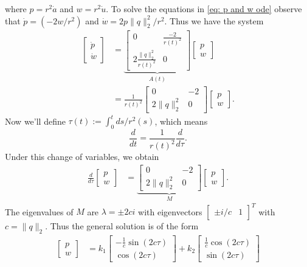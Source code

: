 \documentclass{article}
\begin{document}
where $p = r^2\dot a$ and $w = r^2\dot u$. To solve the equations in \cref{eq: p and w ode} observe that $\dot p = (-2w/r^2)$ and $\dot w = 2p\|q\|_2^2/r^2$. Thus we have the system
\begin{align*}
    \begin{bmatrix}
        \dot p \\ \dot w
    \end{bmatrix} &= 
    \underbrace{
    \begin{bmatrix}
        0 & \frac{-2}{r(t)^2} \\
        2\frac{\|q\|_2^2}{r(t)^2} & 0 
    \end{bmatrix}}_{A(t)}
    \begin{bmatrix}
        p \\
        w
    \end{bmatrix} \\
    &= \frac{1}{r(t)^2}
    \begin{bmatrix}
        0 & -2  \\
        2\|q\|_2^2 & 0 
    \end{bmatrix}
    \begin{bmatrix}
        p \\
        w
    \end{bmatrix}.
\end{align*}
Now we'll define $\tau(t) := \int_0^tds/r^2(s)$, which means 
\[\frac{d}{dt} = \frac{1}{r(t)^2}\frac{d}{d\tau}.\]
Under this change of variables, we obtain
\begin{align*}
    \frac{d}{d\tau}
    \begin{bmatrix}
        p \\ w
    \end{bmatrix} 
    &= \underbrace{\begin{bmatrix}
        0 & -2  \\
        2\|q\|_2^2 & 0 
    \end{bmatrix}}_{M}
    \begin{bmatrix}
        p \\
        w
    \end{bmatrix}.
\end{align*}
The eigenvalues of $M$ are $\lambda = \pm 2ci$ with eigenvectors $\begin{bmatrix}
    \pm i/c & 1
\end{bmatrix}^T$ with $c = \|q\|_2$. Thus the general solution is of the form 
\begin{align*}
    \begin{bmatrix}
        p \\ w
    \end{bmatrix} &= k_1\begin{bmatrix}
        -\frac{1}{c}\sin(2c\tau) \\ \cos(2c\tau)
    \end{bmatrix} + k_2\begin{bmatrix}
        \frac{1}{c}\cos(2c\tau) \\ \sin(2c\tau)
    \end{bmatrix}
\end{align*}
\end{document}
